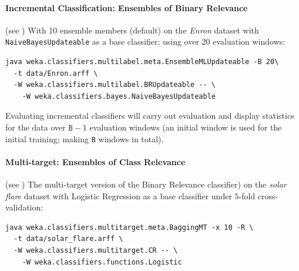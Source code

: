 \documentclass[11pt]{article}
\newcommand{\MEKA}{Meka}
\newcommand{\MOA}{Moa}
\begin{document}

\paragraph{Incremental Classification: Ensembles of Binary Relevance} (see \cite{ECC2,MEDS2}) With 10 ensemble members (default) on the \textit{Enron} dataset with \texttt{NaiveBayesUpdateable} as a base classifier; using over 20 evaluation windows:

\begin{verbatim}
java weka.classifiers.multilabel.meta.EnsembleMLUpdateable -B 20\
  -t data/Enron.arff \
  -W weka.classifiers.multilabel.BRUpdateable -- \
    -W weka.classifiers.bayes.NaiveBayesUpdateable
\end{verbatim}

Evaluating incremental classifiers will carry out evaluation and display statistics for the data over $\texttt{B}-1$ evaluation windows (an initial window is used for the initial training; making \texttt{B} windows in total). %

\paragraph{Multi-target: Ensembles of Class Relevance} (see \cite{UPM}) The multi-target version of the Binary Relevance classifier) on the \textit{solar flare} dataset with Logistic Regression as a base classifier under $5$-fold cross-validation:
\begin{verbatim}
java weka.classifiers.multitarget.meta.BaggingMT -x 10 -R \
  -t data/solar_flare.arff \
  -W weka.classifiers.multitarget.CR -- \
    -W weka.classifiers.functions.Logistic
\end{verbatim}

\end{document}
